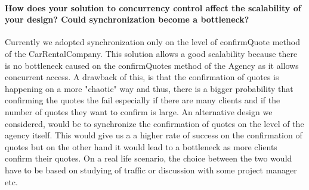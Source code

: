 \documentclass{ds-report}
\begin{document}
	\paragraph{How does your solution to concurrency control affect the scalability of your design? Could synchronization become a bottleneck?\\}
    Currently we adopted synchronization only on the level of confirmQuote method of the CarRentalCompany. This solution allows a
    good scalability because there is no bottleneck caused on the confirmQuotes method of the Agency as it allows concurrent access.
    A drawback of this, is that the confirmation of quotes is happening on a more "chaotic" way and thus, there is a bigger probability
    that confirming the quotes the fail especially if there are many clients and if the number of quotes they want to confirm is large.
    An alternative design we considered, would be to synchronize the confirmation of quotes on the level of the agency itself. This
    would give us a a higher rate of success on the confirmation of quotes but on the other hand it would lead to a bottleneck as
    more clients confirm their quotes.
    On a real life scenario, the choice between the two would have to be based on studying of traffic or discussion with some project
    manager etc.
	
	\clearpage

	
	
\end{document}
